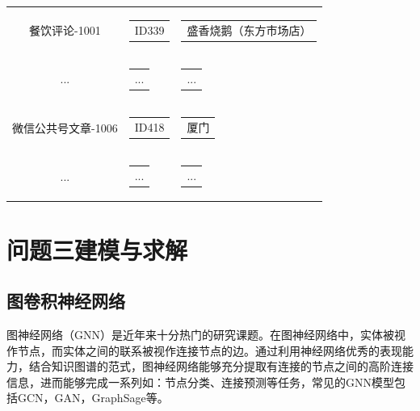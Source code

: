\documentclass[bwprint]{gmcmthesis}
\begin{document}
\begin{center}
\begin{longtable}{c|c|c}
            餐饮评论-1001 & \begin{tabular}[c]{@{}c@{}}
              ID339
              \end{tabular} 
              & \begin{tabular}[c]{@{}l@{}}
                盛香烧鹅（东方市场店）
              \end{tabular} \\
              ... & \begin{tabular}[c]{@{}c@{}}
                ...
              \end{tabular} 
              & \begin{tabular}[c]{@{}l@{}}
                ...
              \end{tabular} \\
              微信公共号文章-1006 & \begin{tabular}[c]{@{}c@{}}
                ID418
                \end{tabular} 
                & \begin{tabular}[c]{@{}l@{}}
                  厦门
                \end{tabular} \\
                ... & \begin{tabular}[c]{@{}c@{}}
                  ...
                \end{tabular} 
                & \begin{tabular}[c]{@{}l@{}}
                  ...
                \end{tabular} \\
      \hline
  \end{longtable}
  \end{center}
\section{问题三建模与求解}

\subsection{图卷积神经网络}

图神经网络（GNN）是近年来十分热门的研究课题。在图神经网络中，实体被视作节点，而实体之间的联系被视作连接节点的边。通过利用神经网络优秀的表现能力，结合知识图谱的范式，图神经网络能够充分提取有连接的节点之间的高阶连接信息，进而能够完成一系列如：节点分类、连接预测等任务，常见的GNN模型包括GCN\cite{kipf_gcn_2017}，GAN\cite{peter_gan_2017}，GraphSage\cite{hamilton_graphsage_2017}等。
\end{document}
